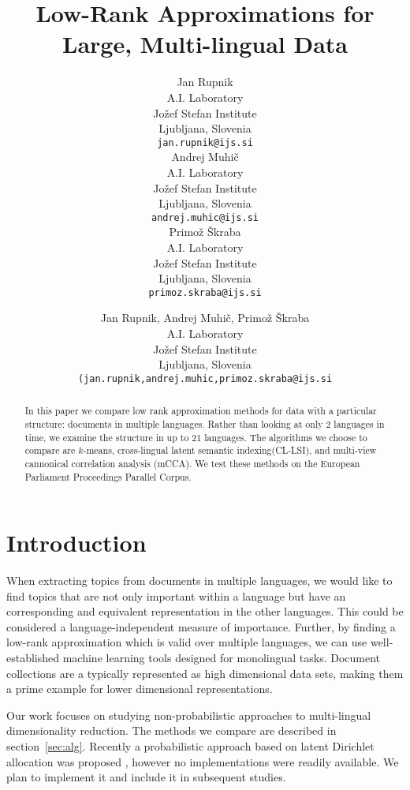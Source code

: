 \documentclass{article} %
\title{Low-Rank Approximations for Large, Multi-lingual Data}
\author{
Jan Rupnik \\
A.I. Laboratory\\
Jo\v zef Stefan Institute\\
Ljubljana, Slovenia\\
\texttt{jan.rupnik@ijs.si} \\
\And
Andrej Muhi\v c\\
A.I. Laboratory\\
Jo\v zef Stefan Institute\\
Ljubljana, Slovenia\\
\texttt{andrej.muhic@ijs.si} \\
\AND
Primo\v z \v Skraba \\
A.I. Laboratory\\
Jo\v zef Stefan Institute\\
Ljubljana, Slovenia\\
\texttt{primoz.skraba@ijs.si} \\
}
\author{
Jan Rupnik, Andrej Muhi\v c, Primo\v z \v Skraba \\
A.I. Laboratory\\
Jo\v zef Stefan Institute\\
Ljubljana, Slovenia\\
\texttt{(jan.rupnik,andrej.muhic,primoz.skraba@ijs.si} \\
}
\begin{document}
\maketitle

\begin{abstract}
In this paper we compare low rank approximation methods for data
with a particular structure: documents in multiple
languages. Rather than looking at only 2 languages in time, we
examine the structure in up to 21 languages. The algorithms we
choose to compare are $k$-means, cross-lingual latent semantic
indexing(CL-LSI), and multi-view cannonical correlation analysis
(mCCA). We test these methods on the European Parliament
Proceedings Parallel Corpus.
\end{abstract}



\section{Introduction}
When extracting topics from documents in multiple languages, we
would like to find topics that are not only important within a
language but have an corresponding and equivalent representation
in the other languages. This could be considered a
language-independent measure of importance. Further, by finding a
low-rank approximation which is valid over multiple languages, we
can use well-established machine learning tools designed for
monolingual tasks.  Document collections are a typically
represented as high dimensional data sets, making them a prime
example for lower dimensional representations.


Our work focuses on studying non-probabilistic approaches to
multi-lingual dimensionality reduction. The methods we compare
are described in section~\ref{sec:alg}. Recently a probabilistic
approach based on latent Dirichlet allocation was proposed
\cite{xLDA}, however no implementations were readily available. We plan to implement it and include it in subsequent studies.
\end{document}
